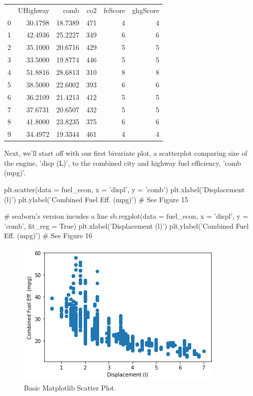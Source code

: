 \begin{tabular}{lrrrrr}
	{} &  UHighway &     comb &  co2 &  feScore &  ghgScore \\
	0 &   30.1798 &  18.7389 &  471 &        4 &         4 \\
	1 &   42.4936 &  25.2227 &  349 &        6 &         6 \\
	2 &   35.1000 &  20.6716 &  429 &        5 &         5 \\
	3 &   33.5000 &  19.8774 &  446 &        5 &         5 \\
	4 &   51.8816 &  28.6813 &  310 &        8 &         8 \\
	5 &   38.5000 &  22.6002 &  393 &        6 &         6 \\
	6 &   36.2109 &  21.4213 &  412 &        5 &         5 \\
	7 &   37.6731 &  20.6507 &  432 &        5 &         5 \\
	8 &   41.8000 &  23.8235 &  375 &        6 &         6 \\
	9 &   34.4972 &  19.3344 &  461 &        4 &         4 \\
\end{tabular}
\newpage

Next, we'll start off with our first bivariate plot, a scatterplot comparing size of the engine, 'disp (L)', to the combined city and highway fuel efficiency, 'comb (mpg)'.

\begin{python}
	plt.scatter(data = fuel_econ, x = 'displ', y = 'comb')
	plt.xlabel('Displacement (l)')
	plt.ylabel('Combined Fuel Eff. (mpg)')
	# See Figure 15
	
	# seaborn's version incudes a line
	sb.regplot(data = fuel_econ, x = 'displ', y = 'comb', fit_reg = True)
	plt.xlabel('Displacement (l)')
	plt.ylabel('Combined Fuel Eff. (mpg)')
	# See Figure 16
\end{python}

\begin{figure}
	\includegraphics{images/figure15.png}
	\caption{Basic Matplotlib Scatter Plot.}\label{fig:figure15}
\end{figure}

